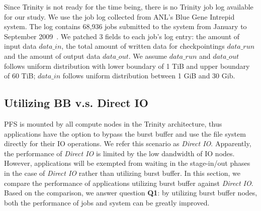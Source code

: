 Since Trinity is not ready for the time being, there is no Trinity job log available for our study.
We use the job log collected from ANL's Blue Gene Intrepid system. The log contains 68,936 jobs
submitted to the system from January to September 2009~\cite{JobTrace}.
We patched 3 fields to each job's log entry: the amount of input data $data\_in$,
the total amount of written data for checkpointings $data\_run$
and the amount of output data $data\_out$.
We assume $data\_run$ and $data\_out$ follows uniform distribution with
lower boundary of 1 TiB and upper boundary of 60 TiB;
$data\_in$ follows uniform distribution between 1 GiB and 30 Gib.



\subsection{Utilizing BB v.s. Direct IO}
\label{Sec:Sim:DirectIOvsBB}



PFS is mounted by all compute nodes in the Trinity architecture, thus applications have the
option to bypass the burst buffer and use the file system directly for their IO operations. 
We refer this scenario as \textit{Direct IO}. Apparently, the performance of \textit{Direct IO}
is limited by the low dandwidth of IO nodes. However, applications will be exempted from 
waiting in the stage-in/out phases in the case of \textit{Direct IO} rather than utilizing burst buffer.
In this section, we compare the performance of applications utilizing burst buffer
against \textit{Direct IO}.
Based on the comparison, we answer question \textbf{Q1}: by utilizing burst buffer nodes,
both the performance of jobs and system can be greatly improved. 


